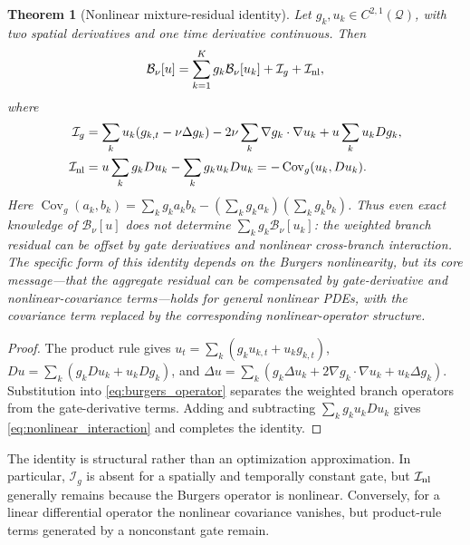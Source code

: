 \documentclass[preprint,12pt]{elsarticle}
\newtheorem{theorem}{Theorem}
\theoremstyle{remark}
\begin{document}
\begin{theorem}[Nonlinear mixture-residual identity]\label{thm:residual_identity}
Let $g_k,u_k\in C^{2,1}(\mathcal Q)$, with two spatial derivatives and one
time derivative continuous. Then
\begin{equation}
\mathcal B_\nu[u]
=\sum_{k=1}^K g_k\mathcal B_\nu[u_k]
+\mathcal I_g+\mathcal I_{\rm nl},
\label{eq:residual_decomposition}
\end{equation}
where
\begin{align}
\mathcal I_g
&=\sum_k u_k(g_{k,t}-\nu\Delta g_k)
-2\nu\sum_k\nabla g_k\cdot\nabla u_k
+u\sum_k u_kDg_k,
\label{eq:gate_interaction}\\
\mathcal I_{\rm nl}
&=u\sum_k g_kDu_k-\sum_k g_ku_kDu_k
=-\operatorname{Cov}_g(u_k,Du_k).
\label{eq:nonlinear_interaction}
\end{align}
Here $\operatorname{Cov}_g(a_k,b_k)=\sum_k g_ka_kb_k-
(\sum_k g_ka_k)(\sum_k g_kb_k)$. Thus even exact knowledge of
$\mathcal B_\nu[u]$ does not determine $\sum_k g_k\mathcal B_\nu[u_k]$:
the weighted branch residual can be offset by gate derivatives and nonlinear
cross-branch interaction.
The specific form of this identity depends on the Burgers nonlinearity, but its core message---that the aggregate residual can be compensated by gate-derivative and nonlinear-covariance terms---holds for general nonlinear PDEs, with the covariance term replaced by the corresponding nonlinear-operator structure.
\end{theorem}
\begin{proof}
The product rule gives
$u_t=\sum_k(g_ku_{k,t}+u_kg_{k,t})$,
$Du=\sum_k(g_kDu_k+u_kDg_k)$, and
$\Delta u=\sum_k(g_k\Delta u_k+2\nabla g_k\!\cdot\!\nabla u_k+u_k\Delta g_k)$.
Substitution into \eqref{eq:burgers_operator} separates the weighted branch
operators from the gate-derivative terms. Adding and subtracting
$\sum_k g_ku_kDu_k$ gives \eqref{eq:nonlinear_interaction} and completes the identity.
\end{proof}

The identity is structural rather than an optimization approximation. In
particular, $\mathcal I_g$ is absent for a spatially and temporally constant
gate, but $\mathcal I_{\rm nl}$ generally remains because the Burgers operator
is nonlinear. Conversely, for a linear differential operator the nonlinear
covariance vanishes, but product-rule terms generated by a nonconstant gate
remain.
\end{document}
